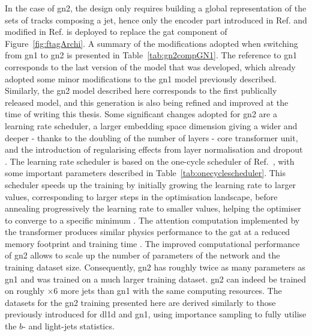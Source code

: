 In the case of \gls{gn2}, the design only requires building a global representation of the sets of tracks composing a jet, hence only the encoder part introduced in Ref. \cite{NIPS_transformerPaper} and modified in Ref. \cite{shleifer2021normformer} is deployed to replace the \gls{gat} component of Figure~\ref{fig:ftagArchi}. A summary of the modifications adopted when switching from \gls{gn1} to \gls{gn2} is presented in Table~\ref{tab:gn2compGN1}. The reference to \gls{gn1} corresponds to the last version of the model that was developed, which already adopted some minor modifications to the \gls{gn1} model previously described. Similarly, the \gls{gn2} model described here corresponds to the first publically released model, and this generation is also being refined and improved at the time of writing this thesis. Some significant changes adopted for \gls{gn2} are a learning rate scheduler, a larger embedding space dimension giving a wider and deeper - thanks to the doubling of the number of layers - core transformer unit, and the introduction of regularising effects from layer normalisation and dropout \cite{ba2016layer}. The learning rate scheduler is based on the one-cycle scheduler of Ref.~\cite{smith2018disciplined}, with some important parameters described in Table~\ref{tab:onecyclescheduler}. This scheduler speeds up the training by initially growing the learning rate to larger values, corresponding to larger steps in the optimisation landscape, before annealing progressively the learning rate to smaller values, helping the optimiser to converge to a specific minimum \cite{smith2018superconvergence}. The attention computation implemented by the transformer produces similar physics performance to the \gls{gat} at a reduced memory footprint and training time \cite{duperrin2023flavour}. The improved computational performance of \gls{gn2} allows to scale up the number of parameters of the network and the training dataset size. Consequently, \gls{gn2} has roughly twice as many parameters as \gls{gn1} and was trained on a much larger training dataset. \gls{gn2} can indeed be trained on roughly $\times 6$ more jets than \gls{gn1} with the same computing resources. The datasets for the \gls{gn2} training presented here are derived similarly to those previously introduced for \gls{dl1d} and \gls{gn1}, using importance sampling to fully utilise the $b$- and light-jets statistics. 

